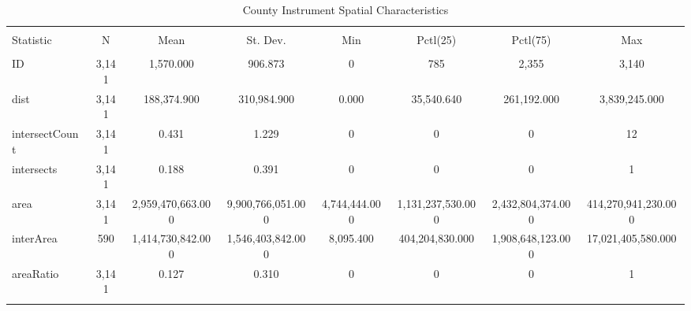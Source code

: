 
\begin{table}[!htbp] \centering 
  \caption{County Instrument Spatial Characteristics} 
  \label{} 
\scriptsize 
\begin{tabular}{@{\extracolsep{5pt}}lccccccc} 
\\[-1.8ex]\hline 
\hline \\[-1.8ex] 
Statistic & \multicolumn{1}{c}{N} & \multicolumn{1}{c}{Mean} & \multicolumn{1}{c}{St. Dev.} & \multicolumn{1}{c}{Min} & \multicolumn{1}{c}{Pctl(25)} & \multicolumn{1}{c}{Pctl(75)} & \multicolumn{1}{c}{Max} \\ 
\hline \\[-1.8ex] 
ID & 3,141 & 1,570.000 & 906.873 & 0 & 785 & 2,355 & 3,140 \\ 
dist & 3,141 & 188,374.900 & 310,984.900 & 0.000 & 35,540.640 & 261,192.000 & 3,839,245.000 \\ 
intersectCount & 3,141 & 0.431 & 1.229 & 0 & 0 & 0 & 12 \\ 
intersects & 3,141 & 0.188 & 0.391 & 0 & 0 & 0 & 1 \\ 
area & 3,141 & 2,959,470,663.000 & 9,900,766,051.000 & 4,744,444.000 & 1,131,237,530.000 & 2,432,804,374.000 & 414,270,941,230.000 \\ 
interArea & 590 & 1,414,730,842.000 & 1,546,403,842.000 & 8,095.400 & 404,204,830.000 & 1,908,648,123.000 & 17,021,405,580.000 \\ 
areaRatio & 3,141 & 0.127 & 0.310 & 0 & 0 & 0 & 1 \\ 
\hline \\[-1.8ex] 
\end{tabular} 
\end{table} 
